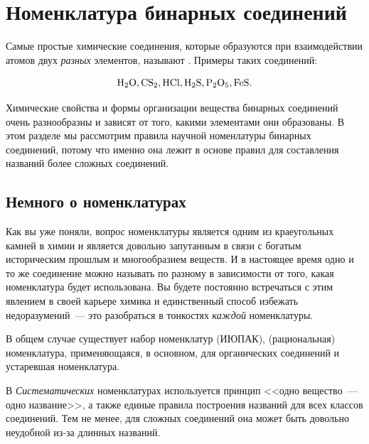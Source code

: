 \clearpage

\section{Номенклатура бинарных соединений}\label{sec:nomenclature_of_binary_compounds}

Самые простые химические соединения, которые образуются при взаимодействии атомов двух \emph{разных} элементов, называют . Примеры таких соединений:

\begin{equation*}
    \ce{H2O, CS2, HCl, H2S, P2O5, FeS}.
\end{equation*}

Химические свойства и формы организации вещества бинарных соединений очень разнообразны и зависят от того, какими элементами они образованы. В этом разделе мы рассмотрим правила научной номенлатуры бинарных соединений, потому что именно она лежит в основе правил для составления названий более сложных соединений.

\subsection*{Немного о номенклатурах}

Как вы уже поняли, вопрос номенклатуры является одним из краеугольных камней в химии и является довольно запутанным в связи с богатым историческим прошлым и многообразием веществ. И в настоящее время одно и то же соединение можно называть по разному в зависимости от того, какая номенклатура будет использована. Вы будете постоянно встречаться с этим явлением в своей карьере химика и единственный способ избежать недоразумений~--- это разобраться в тонкостях \emph{каждой} номенклатуры.

В общем случае существует набор  номенклатур (ИЮПАК),  (рациональная) номенклатура, применяющаяся, в основном, для органических соединений и устаревшая  номенклатура.

В \emph{Систематических} номенклатурах используется принцип <<одно вещество~--- одно название>>, а также единые правила построения названий для всех классов соединений. Тем не менее, для сложных соединений она может быть довольно неудобной из-за длинных названий.

